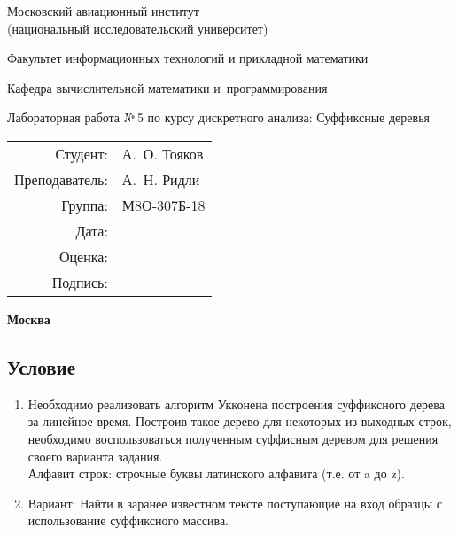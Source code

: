 \documentclass[12pt]{article}
\begin{document}
\thispagestyle{empty}
\begin{center}
	\bfseries

	{\Large Московский авиационный институт\\ (национальный исследовательский университет)

	}

	\vspace{48pt}

	{\large Факультет информационных технологий и прикладной математики
	}

	\vspace{36pt}


	{\large Кафедра вычислительной математики и~программирования

	}


	\vspace{48pt}

	{Лабораторная работа №\,5 по курсу дискретного анализа: Суффиксные деревья}

\end{center}

\vspace{72pt}

\begin{flushright}
	\begin{tabular}{rl}
		Студент:       & А.\, О. Тояков   \\
		Преподаватель: & А.\, Н. Ридли \\
		Группа:        & М8О-307Б-18      \\
		Дата:          &                 \\
		Оценка:        &                  \\
		Подпись:       &                  \\
	\end{tabular}
\end{flushright}

\vfill

\begin{center}
	\bfseries
	Москва\\
	\the\year
\end{center}

\newpage

\subsection*{Условие}

\begin{enumerate}
\item Необходимо реализовать алгоритм Укконена построения суффиксного дерева за линейное время. Построив такое дерево для некоторых из выходных строк, необходимо воспользоваться полученным суффисным деревом для решения своего варианта задания.\\
Алфавит строк: строчные буквы латинского алфавита (т.е. от a до z).
\item Вариант: Найти в заранее известном тексте поступающие на вход образцы с использование суффиксного массива.
\end{enumerate}
\end{document}
